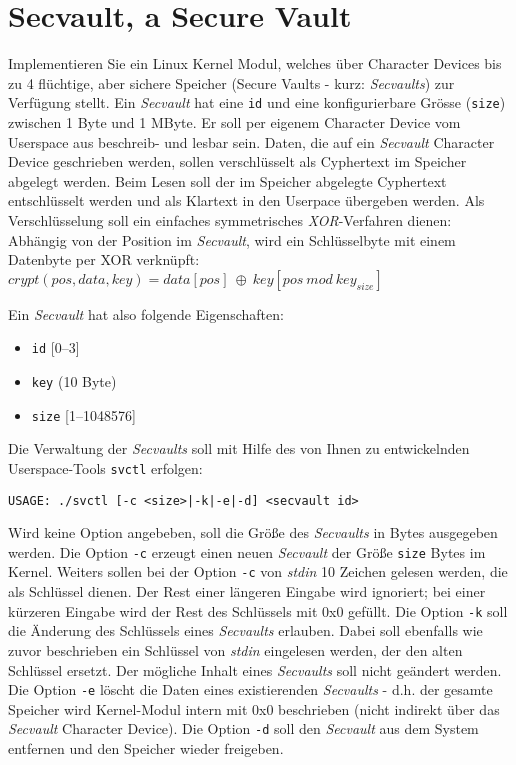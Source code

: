 \documentclass{article}
\begin{document}
\section*{Secvault, a Secure Vault}

Implementieren Sie ein Linux Kernel Modul, welches {\"u}ber Character Devices bis zu 4 fl{\"u}chtige, aber sichere Speicher (Secure Vaults - kurz: \emph{Secvaults}) zur Verf{\"u}gung stellt.
Ein \emph{Secvault} hat eine \texttt{id} und eine konfigurierbare Gr{\"o}sse (\texttt{size}) zwischen 1 Byte und 1 MByte.
Er soll per eigenem Character Device vom Userspace aus beschreib- und lesbar sein. Daten, die auf ein \emph{Secvault} Character Device geschrieben werden, sollen verschl{\"u}sselt als Cyphertext im Speicher abgelegt werden.
Beim Lesen soll der im Speicher abgelegte Cyphertext entschl{\"u}sselt werden und als Klartext in den Userpace {\"u}bergeben werden.
Als Verschl{\"u}sselung soll ein einfaches symmetrisches \emph{XOR}-Verfahren dienen: Abh{\"a}ngig von der Position im \emph{Secvault}, wird ein Schl{\"u}sselbyte mit einem Datenbyte per XOR verkn{\"u}pft:\\
$crypt(pos, data, key) = data[pos]\ \oplus\ key[pos\ mod\ key_{size}]$

Ein \emph{Secvault} hat also folgende Eigenschaften:
\begin{itemize}
\item \texttt{id}   [0--3]
\item \texttt{key}  (10 Byte)
\item \texttt{size} [1--1048576]
\end{itemize}

Die Verwaltung der \emph{Secvaults} soll mit Hilfe des von Ihnen zu entwickelnden Userspace-Tools \texttt{svctl} erfolgen:
\begin{verbatim}
USAGE: ./svctl [-c <size>|-k|-e|-d] <secvault id>
\end{verbatim}

Wird keine Option angebeben, soll die Gr{\"o}{\ss}e des \emph{Secvaults} in Bytes ausgegeben werden.
Die Option \texttt{-c} erzeugt einen neuen \emph{Secvault} der
Gr{\"o}{\ss}e \texttt{size} Bytes im Kernel.
Weiters sollen bei der Option \texttt{-c} von \emph{stdin} 10 Zeichen gelesen werden, die als Schl{\"u}ssel dienen.
Der Rest einer l{\"a}ngeren Eingabe wird ignoriert; bei einer k{\"u}rzeren Eingabe wird der Rest des Schl{\"u}ssels mit 0x0 gef{\"u}llt.
Die Option \texttt{-k} soll die {\"A}nderung des Schl{\"u}ssels eines \emph{Secvaults} erlauben.
Dabei soll ebenfalls wie zuvor beschrieben ein Schl{\"u}ssel von \emph{stdin} eingelesen werden, der den alten Schl{\"u}ssel ersetzt.
Der m{\"o}gliche Inhalt eines \emph{Secvaults} soll nicht ge{\"a}ndert werden.
Die Option \texttt{-e} l{\"o}scht die Daten eines existierenden \emph{Secvaults} - d.h. der gesamte Speicher wird Kernel-Modul intern mit 0x0 beschrieben (nicht indirekt {\"u}ber das \emph{Secvault} Character Device).
Die Option \texttt{-d} soll den \emph{Secvault} aus dem System entfernen und den Speicher wieder freigeben.
\end{document}
